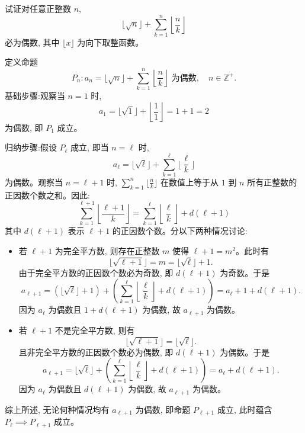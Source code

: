 \begin{questions}
    \question 试证对任意正整数 $n$, 
    \[
    \lfloor\sqrt{n}\rfloor + \sum_{k=1}^{n} \left\lfloor\frac{n}{k}\right\rfloor
    \]
    必为偶数, 其中 $\lfloor x \rfloor$ 为向下取整函数。
    \begin{solution}
        定义命题 
        \[
        P_n:a_n = \lfloor\sqrt{n}\rfloor + \sum_{k=1}^n \left\lfloor\frac{n}{k}\right\rfloor \text{ 为偶数}, \quad n \in \mathbb{Z}^+.
        \]
        基础步骤:观察当 $n=1$ 时, 
        \[
        a_1 = \lfloor\sqrt{1}\rfloor + \left\lfloor\frac{1}{1}\right\rfloor = 1 + 1 = 2
        \]
        为偶数, 即 $P_1$ 成立。

        归纳步骤:假设 $P_{\ell}$ 成立, 即当 $n=\ell$ 时, 
        \[
        a_{\ell} = \lfloor\sqrt{\ell}\rfloor + \sum_{k=1}^{\ell} \lfloor\frac{\ell}{k}\rfloor
        \]
        为偶数。观察当 $n=\ell+1$ 时, $\sum_{k=1}^{n} \lfloor\frac{n}{k}\rfloor$ 在数值上等于从 $1$ 到 $n$ 所有正整数的正因数个数之和。因此:
        \[
        \sum_{k=1}^{\ell+1} \left\lfloor\frac{\ell+1}{k}\right\rfloor = \sum_{k=1}^{\ell} \left\lfloor\frac{\ell}{k}\right\rfloor + d(\ell+1)
        \]
        其中 $d(\ell+1)$ 表示 $\ell+1$ 的正因数个数。分以下两种情况讨论:
        \begin{itemize}
            \item 若 $\ell+1$ 为完全平方数, 则存在正整数 $m$ 使得 $\ell+1 = m^2$。此时有
            \[
            \lfloor\sqrt{\ell+1}\rfloor = m = \lfloor\sqrt{\ell}\rfloor + 1.
            \]
            由于完全平方数的正因数个数必为奇数, 即 $d(\ell+1)$ 为奇数。于是
            \[
            a_{\ell+1} = (\lfloor\sqrt{\ell}\rfloor + 1) + \left( \sum_{k=1}^{\ell} \left\lfloor\frac{\ell}{k}\right\rfloor + d(\ell+1) \right) = a_\ell + 1 + d(\ell+1).
            \]
            因为 $a_\ell$ 为偶数且 $1 + d(\ell+1)$ 为偶数, 故 $a_{\ell+1}$ 为偶数。

            \item 若 $\ell+1$ 不是完全平方数, 则有
            \[
            \lfloor\sqrt{\ell+1}\rfloor = \lfloor\sqrt{\ell}\rfloor.
            \]
            且非完全平方数的正因数个数必为偶数, 即 $d(\ell+1)$ 为偶数。于是
            \[
            a_{\ell+1} = \lfloor\sqrt{\ell}\rfloor + \left( \sum_{k=1}^{\ell} \left\lfloor\frac{\ell}{k}\right\rfloor + d(\ell+1) \right) = a_\ell + d(\ell+1).
            \]
            因为 $a_\ell$ 为偶数且 $d(\ell+1)$ 为偶数, 故 $a_{\ell+1}$ 为偶数。
        \end{itemize}
        综上所述, 无论何种情况均有 $a_{\ell+1}$ 为偶数, 即命题 $P_{\ell+1}$ 成立, 此时蕴含 $P_\ell \implies P_{\ell+1}$ 成立。


\end{solution}
\end{questions}
